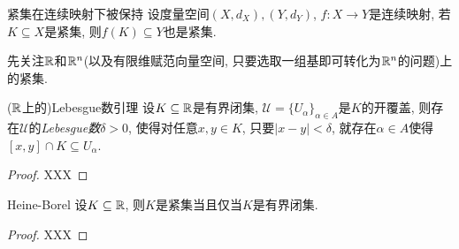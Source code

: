 \begin{lemma}{紧集在连续映射下被保持}
	设度量空间$(X,d_X),(Y,d_Y)$, $f:X \to Y$是连续映射, 若$K \subseteq X$是紧集, 则$f(K) \subseteq Y$也是紧集. 
\end{lemma}

先关注$\mathbb{R}$和$\mathbb{R} ^n$(以及有限维赋范向量空间, 只要选取一组基即可转化为$\mathbb{R} ^n$的问题)上的紧集. 

\begin{proposition}{($\mathbb{R}$上的)Lebesgue数引理}
	设$K \subseteq \mathbb{R}$是有界闭集, $\mathcal{U} = \{ U_{\alpha} \}_{\alpha \in A}$是$K$的开覆盖, 则存在$\mathcal{U}$的\textit{Lebesgue数}$\delta >0$, 使得对任意$x,y \in K$, 只要$|x-y|<\delta$, 就存在$\alpha \in A$使得$[x,y] \cap K \subseteq U_{\alpha}$. 
\end{proposition}
\begin{proof}
	XXX
\end{proof}

\begin{theorem}{Heine-Borel}
	设$K \subseteq \mathbb{R}$, 则$K$是紧集当且仅当$K$是有界闭集. 
\end{theorem}
\begin{proof}
	XXX
\end{proof}